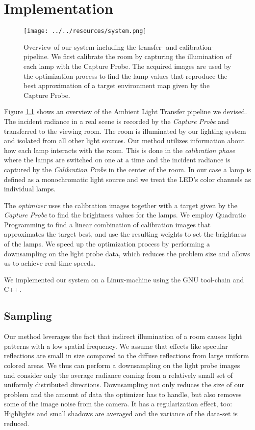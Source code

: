 

\chapter{Implementation}
\label{chap:implementation}

 \begin{figure}[H]
  \centering
  \texttt{[image: ../../resources/system.png]}
  \caption[Overview of our system]{Overview of our system including the transfer- and calibration-pipeline. We first calibrate the room by capturing the illumination of each lamp with the Capture Probe.
    The acquired images are used by the optimization process to find the lamp values that reproduce the best approximation of a target environment map given by the Capture Probe. }
  \label{fig:overview}
 \end{figure}

 Figure \ref{fig:overview} shows an overview of the Ambient Light Transfer pipeline we devised.
 The incident radiance in a real scene is recorded by the \emph{Capture Probe} and transferred to the viewing room. 
 The room is illuminated by our lighting system and isolated from all other light sources.
 Our method utilizes information about how each lamp interacts with the room. 
 This is done in the \emph{calibration phase} where the lamps are switched on one at a time  and the incident radiance is captured by the \emph{Calibration Probe} in the center of the room.
 In our case a lamp is defined as a monochromatic light source and we treat the LED's color channels as individual lamps.
 
 The \emph{optimizer} uses the calibration images together with a target given by the \emph{Capture Probe} to find the brightness values for the lamps.
 We employ Quadratic Programming to find a linear combination of calibration images that approximates the target best, and use the resulting weights to set the brightness of the lamps.
 We speed up the optimization process by performing a downsampling on the light probe data, which reduces the problem size and allows us to achieve real-time speeds.
 
 We implemented our system on a Linux-machine using the GNU tool-chain and C++.

 
\section{Sampling}
\label{sec:sampling}
 
 Our method leverages the fact that indirect illumination of a room causes light patterns with a low spatial frequency.
 We assume that effects like specular reflections are small in size compared to the diffuse reflections from large uniform colored areas.
 We thus can perform a downsampling on the light probe images and consider only the average radiance coming from a relatively small set of uniformly distributed directions.
 Downsampling not only reduces the size of our problem and the amount of data the optimizer has to handle, but also removes some of the image noise from the camera.
 It has a regularization effect, too: Highlights and small shadows are averaged and the variance of the data-set is reduced.
  
